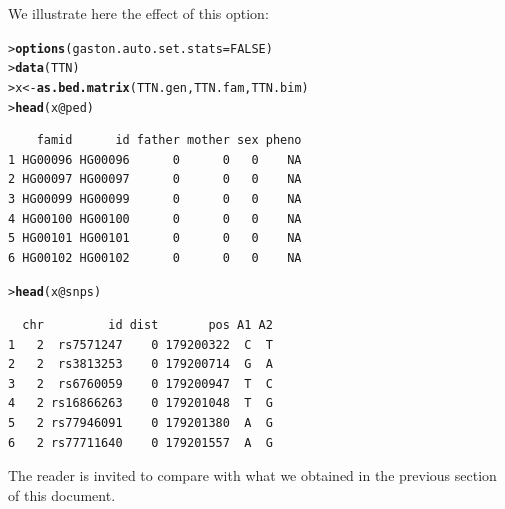 \documentclass{article}\usepackage[]{graphicx}\usepackage[]{color}
\makeatletter
\newcommand{\hlnum}[1]{\textcolor[rgb]{0.686,0.059,0.569}{#1}}%
\newcommand{\hlopt}[1]{\textcolor[rgb]{0,0,0}{#1}}%
\newcommand{\hlstd}[1]{\textcolor[rgb]{0.345,0.345,0.345}{#1}}%
\newcommand{\hlkwb}[1]{\textcolor[rgb]{0.69,0.353,0.396}{#1}}%
\newcommand{\hlkwc}[1]{\textcolor[rgb]{0.333,0.667,0.333}{#1}}%
\newcommand{\hlkwd}[1]{\textcolor[rgb]{0.737,0.353,0.396}{\textbf{#1}}}%
\newenvironment{kframe}{%
 \def\at@end@of@kframe{}%
 \ifinner\ifhmode%
  \def\at@end@of@kframe{\end{minipage}}%
  \begin{minipage}{\columnwidth}%
 \fi\fi%
 \def\FrameCommand##1{\hskip\@totalleftmargin \hskip-\fboxsep
 \colorbox{shadecolor}{##1}\hskip-\fboxsep
     \hskip-\linewidth \hskip-\@totalleftmargin \hskip\columnwidth}%
 \MakeFramed {\advance\hsize-\width
   \@totalleftmargin\z@ \linewidth\hsize
   \@setminipage}}%
 {\par\unskip\endMakeFramed%
 \at@end@of@kframe}
\newenvironment{knitrout}{}{} %
\makeatother
\begin{document}
  We illustrate here the effect of this option:
\begin{knitrout}
\color{fgcolor}\begin{kframe}
\begin{alltt}
\hlstd{> }\hlkwd{options}\hlstd{(}\hlkwc{gaston.auto.set.stats} \hlstd{=} \hlnum{FALSE}\hlstd{)}
\hlstd{> }\hlkwd{data}\hlstd{(TTN)}
\hlstd{> }\hlstd{x} \hlkwb{<-} \hlkwd{as.bed.matrix}\hlstd{(TTN.gen, TTN.fam, TTN.bim)}
\hlstd{> }\hlkwd{head}\hlstd{(x}\hlopt{@}\hlkwc{ped}\hlstd{)}
\end{alltt}
\begin{verbatim}
    famid      id father mother sex pheno
1 HG00096 HG00096      0      0   0    NA
2 HG00097 HG00097      0      0   0    NA
3 HG00099 HG00099      0      0   0    NA
4 HG00100 HG00100      0      0   0    NA
5 HG00101 HG00101      0      0   0    NA
6 HG00102 HG00102      0      0   0    NA
\end{verbatim}
\begin{alltt}
\hlstd{> }\hlkwd{head}\hlstd{(x}\hlopt{@}\hlkwc{snps}\hlstd{)}
\end{alltt}
\begin{verbatim}
  chr         id dist       pos A1 A2
1   2  rs7571247    0 179200322  C  T
2   2  rs3813253    0 179200714  G  A
3   2  rs6760059    0 179200947  T  C
4   2 rs16866263    0 179201048  T  G
5   2 rs77946091    0 179201380  A  G
6   2 rs77711640    0 179201557  A  G
\end{verbatim}
\end{kframe}
\end{knitrout}

  The reader is invited to compare with what we obtained in the previous section of this document.
\end{document}
